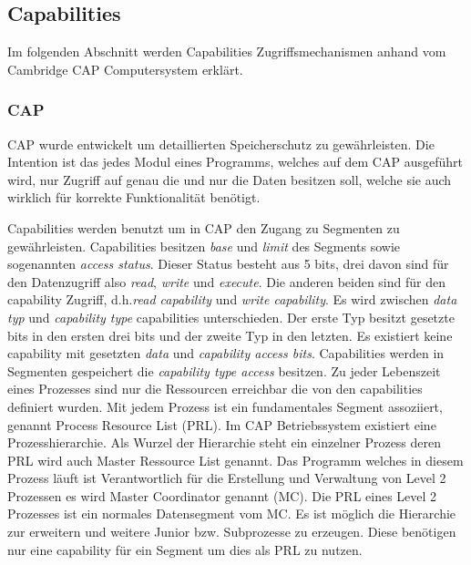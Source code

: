 \documentclass[11pt,technote]{IEEEtran}
\begin{document}
    \subsection{Capabilities} \label{sec:secure:capability}
      Im folgenden Abschnitt werden Capabilities Zugriffsmechanismen anhand vom Cambridge CAP Computersystem erkl\"art.
      \subsubsection{CAP}
		     CAP wurde entwickelt um detaillierten Speicherschutz zu gew\"ahrleisten. Die Intention ist das jedes Modul eines Programms,
		     welches auf dem CAP ausgef\"uhrt wird, nur Zugriff auf genau die und nur die Daten besitzen soll,
		     welche sie auch wirklich f\"ur korrekte Funktionalit\"at ben\"otigt.
		     
		     Capabilities werden benutzt um in CAP den Zugang zu Segmenten zu gew\"ahrleisten.
		     Capabilities besitzen \textit{base} und \textit{limit} des Segments sowie sogenannten \textit{access status}. Dieser Status
		     besteht aus 5 bits, drei davon sind f\"ur den Datenzugriff also \textit{read}, \textit{write} und \textit{execute}.
		     Die anderen beiden sind f\"ur den capability Zugriff, d.h.\textit{read capability} und \textit{write capability}.
		     Es wird zwischen \textit{data typ} und \textit{capability type} capabilities unterschieden. Der erste Typ besitzt gesetzte bits in den ersten drei bits 
		     und der zweite Typ in den letzten. Es existiert keine capability mit gesetzten \textit{data} und \textit{capability access bits}.
		     Capabilities werden in Segmenten gespeichert die \textit{capability type access} besitzen.
		     Zu jeder Lebenszeit eines Prozesses sind nur die Ressourcen erreichbar die von den capabilities definiert wurden.
		     Mit jedem Prozess ist ein fundamentales Segment assoziiert, genannt Process Resource List (PRL). 
		     Im CAP Betriebssystem existiert eine Prozesshierarchie. Als Wurzel der Hierarchie steht ein einzelner Prozess deren PRL wird auch Master Ressource List 
		     genannt. Das Programm welches in diesem Prozess l\"auft ist Verantwortlich f\"ur die Erstellung und Verwaltung von Level 2 
		     Prozessen es wird Master Coordinator genannt (MC).
		     Die PRL eines Level 2 Prozesses ist ein normales Datensegment vom MC. Es ist m\"oglich die Hierarchie zur erweitern und weitere Junior
		     bzw. Subprozesse zu erzeugen. Diese ben\"otigen nur eine capability f\"ur ein Segment um dies als PRL zu nutzen.
		     
\end{document}

